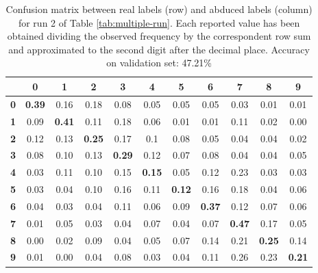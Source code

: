 \begin{table}[H]
  \caption{Confusion matrix between real labels (row) and abduced labels (column) for run 2 of Table \ref{tab:multiple-run}. Each reported value has been obtained dividing the observed frequency by the correspondent row sum and approximated to the second digit after the decimal place. Accuracy on validation set: 47.21\%}
  \label{tab:confusion-matrix-2}
  \centering
  \begin{tabular}{ccccccccccc}  
						& \textbf{0} & \textbf{1} & \textbf{2} & \textbf{3} & \textbf{4} & \textbf{5} & \textbf{6} & \textbf{7} & \textbf{8} & \textbf{9}\\
	\hline
	\textbf{0}			& \textbf{0.39} & 0.16 & 0.18 & 0.08 & 0.05 & 0.05 & 0.05 & 0.03 & 0.01 & 0.01  \\
	\hline
	\textbf{1}			& 0.09 & \textbf{0.41} & 0.11 & 0.18 & 0.06 & 0.01 & 0.01 & 0.11 & 0.02 & 0.00  \\
	\hline
	\textbf{2}			& 0.12 & 0.13 & \textbf{0.25} & 0.17 & 0.1  & 0.08 & 0.05 & 0.04 & 0.04 & 0.02  \\
	\hline
	\textbf{3} 			& 0.08 & 0.10 & 0.13 & \textbf{0.29} & 0.12 & 0.07 & 0.08 & 0.04 & 0.04 & 0.05  \\
	\hline
	\textbf{4} 			& 0.03 & 0.11 & 0.10 & 0.15 & \textbf{0.15} & 0.05 & 0.12 & 0.23 & 0.03 & 0.03  \\
	\hline
	\textbf{5} 			& 0.03 & 0.04 & 0.10 & 0.16 & 0.11 & \textbf{0.12} & 0.16 & 0.18 & 0.04 & 0.06  \\
	\hline
	\textbf{6} 			& 0.04 & 0.03 & 0.04 & 0.11 & 0.06 & 0.09 & \textbf{0.37} & 0.12 & 0.07 & 0.06  \\
	\hline
	\textbf{7} 			& 0.01 & 0.05 & 0.03 & 0.04 & 0.07 & 0.04 & 0.07 & \textbf{0.47} & 0.17 & 0.05  \\
	\hline
	\textbf{8} 			& 0.00 & 0.02 & 0.09 & 0.04 & 0.05 & 0.07 & 0.14 & 0.21 & \textbf{0.25} & 0.14  \\
	\hline
	\textbf{9} 			& 0.01 & 0.00 & 0.04 & 0.08 & 0.03 & 0.04 & 0.11 & 0.26 & 0.23 & \textbf{0.21}  \\
	\bottomrule
	\end{tabular}
\end{table}


